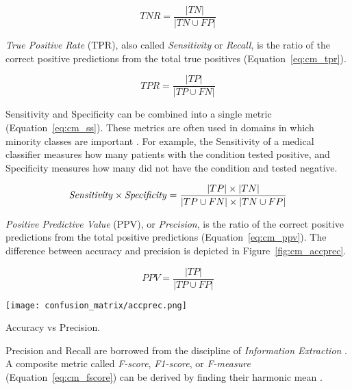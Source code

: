 \begin{equation}
\label{eq:cm_tnr}
TNR = \frac{|TN|}{|TN \cup FP|}
\end{equation}

\textit{True Positive Rate} (TPR), also called \textit{Sensitivity} or \textit{Recall}, is the ratio of the correct positive predictions from the total true positives (Equation~\ref{eq:cm_tpr}).

\begin{equation}
\label{eq:cm_tpr}
TPR = \frac{|TP|}{|TP \cup FN|}
\end{equation}

Sensitivity and Specificity can be combined into a single metric (Equation~\ref{eq:cm_ss}). These metrics are often used in  domains in which minority classes are important \citep{kuhn2013applied}. For example, the Sensitivity of a medical classifier \citep{el2010hybrid} measures how many patients with the condition tested positive, and Specificity measures how many did not have the condition and tested negative.

\begin{equation}
\label{eq:cm_ss}
\textnormal{\textit{Sensitivity}} \times \textnormal{\textit{Specificity}} = \frac{|TP| \times |TN|}{|TP \cup FN| \times |TN \cup FP|}
\end{equation}

\textit{Positive Predictive Value} (PPV), or \textit{Precision}, is the ratio of the correct positive predictions from the total positive predictions (Equation~\ref{eq:cm_ppv}). The difference between accuracy and precision is depicted in Figure~\ref{fig:cm_accprec}.

\begin{equation}
\label{eq:cm_ppv}
PPV = \frac{|TP|}{|TP \cup FP|}
\end{equation}

\begin{marginfigure}
  \texttt{[image: confusion\_matrix/accprec.png]}
  \caption{Accuracy vs Precision.}
  \label{fig:cm_accprec}
\end{marginfigure}

Precision and Recall are borrowed from the discipline of \textit{Information Extraction} \citep{sokolova2009systematic}. A composite metric called \textit{F-score}, \textit{F1-score}, or \textit{F-measure} (Equation~\ref{eq:cm_fscore}) can be derived by finding their harmonic mean \citep{kelleher2015fundamentals}.

